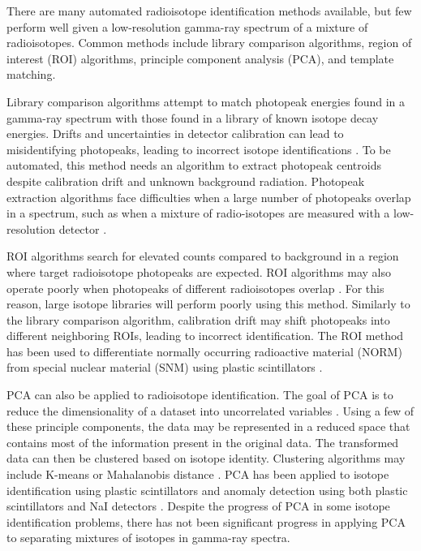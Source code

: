 \documentclass[tocnosub,noragright,centerchapter,12pt,fullpage]{uiucecethesis09}
\begin{document}
There are many automated radioisotope identification methods available, but few perform well given a low-resolution gamma-ray spectrum of a mixture of radioisotopes. Common methods include library comparison algorithms, region of interest (ROI) algorithms, principle component analysis (PCA), and template matching.

Library comparison algorithms attempt to match photopeak energies found in a gamma-ray spectrum with those found in a library of known isotope decay energies. Drifts and uncertainties in detector calibration can lead to misidentifying photopeaks, leading to incorrect isotope identifications \cite{burr2009}. To be automated, this method needs an algorithm to extract photopeak centroids despite calibration drift and unknown background radiation. Photopeak extraction algorithms face difficulties when a large number of photopeaks overlap in a spectrum, such as when a mixture of radio-isotopes are measured with a low-resolution detector \cite{xiong2015}.

ROI algorithms search for elevated counts compared to background in a region where target radioisotope photopeaks are expected. ROI algorithms may also operate poorly when photopeaks of different radioisotopes overlap \cite{burr2009}. For this reason, large isotope libraries will perform poorly using this method. Similarly to the library comparison algorithm, calibration drift may shift photopeaks into different neighboring ROIs, leading to incorrect identification. The ROI method has been used to differentiate normally occurring radioactive material (NORM) from special nuclear material (SNM) using plastic scintillators \cite{Ely2006}.

PCA can also be applied to radioisotope identification. The goal of PCA is to reduce the dimensionality of a dataset into uncorrelated variables \cite{Jolliffe2002}. Using a few of these principle components, the data may be represented in a reduced space that contains most of the information present in the original data. The transformed data can then be clustered based on isotope identity. Clustering algorithms may include K-means or Mahalanobis distance \cite{Kanungo2002, Kumari2012}. PCA has been applied to isotope identification using plastic scintillators \cite{Boardman2012} and anomaly detection using both plastic scintillators and NaI detectors \cite{runkle2006b}. Despite the progress of PCA in some isotope identification problems, there has not been significant progress in applying PCA to separating mixtures of isotopes in gamma-ray spectra.
\end{document}
